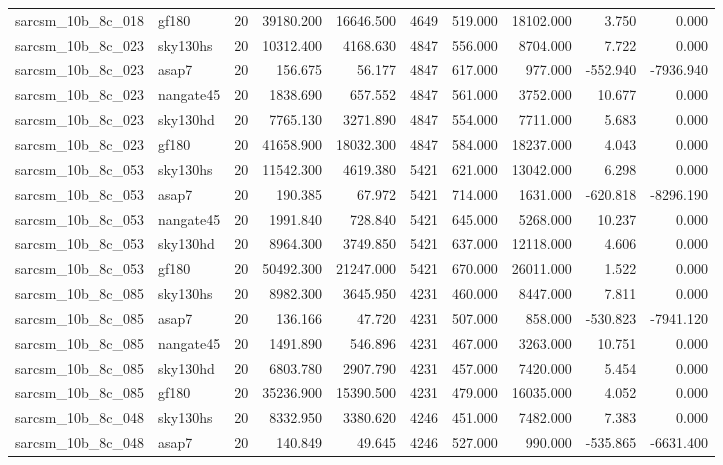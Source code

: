 \begin{longtable}{llrrrrrrrr}
sarcsm\_10b\_8c\_018 & gf180 & 20 & 39180.200 & 16646.500 & 4649 & 519.000 & 18102.000 & 3.750 & 0.000 \\
sarcsm\_10b\_8c\_023 & sky130hs & 20 & 10312.400 & 4168.630 & 4847 & 556.000 & 8704.000 & 7.722 & 0.000 \\
sarcsm\_10b\_8c\_023 & asap7 & 20 & 156.675 & 56.177 & 4847 & 617.000 & 977.000 & -552.940 & -7936.940 \\
sarcsm\_10b\_8c\_023 & nangate45 & 20 & 1838.690 & 657.552 & 4847 & 561.000 & 3752.000 & 10.677 & 0.000 \\
sarcsm\_10b\_8c\_023 & sky130hd & 20 & 7765.130 & 3271.890 & 4847 & 554.000 & 7711.000 & 5.683 & 0.000 \\
sarcsm\_10b\_8c\_023 & gf180 & 20 & 41658.900 & 18032.300 & 4847 & 584.000 & 18237.000 & 4.043 & 0.000 \\
sarcsm\_10b\_8c\_053 & sky130hs & 20 & 11542.300 & 4619.380 & 5421 & 621.000 & 13042.000 & 6.298 & 0.000 \\
sarcsm\_10b\_8c\_053 & asap7 & 20 & 190.385 & 67.972 & 5421 & 714.000 & 1631.000 & -620.818 & -8296.190 \\
sarcsm\_10b\_8c\_053 & nangate45 & 20 & 1991.840 & 728.840 & 5421 & 645.000 & 5268.000 & 10.237 & 0.000 \\
sarcsm\_10b\_8c\_053 & sky130hd & 20 & 8964.300 & 3749.850 & 5421 & 637.000 & 12118.000 & 4.606 & 0.000 \\
sarcsm\_10b\_8c\_053 & gf180 & 20 & 50492.300 & 21247.000 & 5421 & 670.000 & 26011.000 & 1.522 & 0.000 \\
sarcsm\_10b\_8c\_085 & sky130hs & 20 & 8982.300 & 3645.950 & 4231 & 460.000 & 8447.000 & 7.811 & 0.000 \\
sarcsm\_10b\_8c\_085 & asap7 & 20 & 136.166 & 47.720 & 4231 & 507.000 & 858.000 & -530.823 & -7941.120 \\
sarcsm\_10b\_8c\_085 & nangate45 & 20 & 1491.890 & 546.896 & 4231 & 467.000 & 3263.000 & 10.751 & 0.000 \\
sarcsm\_10b\_8c\_085 & sky130hd & 20 & 6803.780 & 2907.790 & 4231 & 457.000 & 7420.000 & 5.454 & 0.000 \\
sarcsm\_10b\_8c\_085 & gf180 & 20 & 35236.900 & 15390.500 & 4231 & 479.000 & 16035.000 & 4.052 & 0.000 \\
sarcsm\_10b\_8c\_048 & sky130hs & 20 & 8332.950 & 3380.620 & 4246 & 451.000 & 7482.000 & 7.383 & 0.000 \\
sarcsm\_10b\_8c\_048 & asap7 & 20 & 140.849 & 49.645 & 4246 & 527.000 & 990.000 & -535.865 & -6631.400 \\

\end{longtable}
